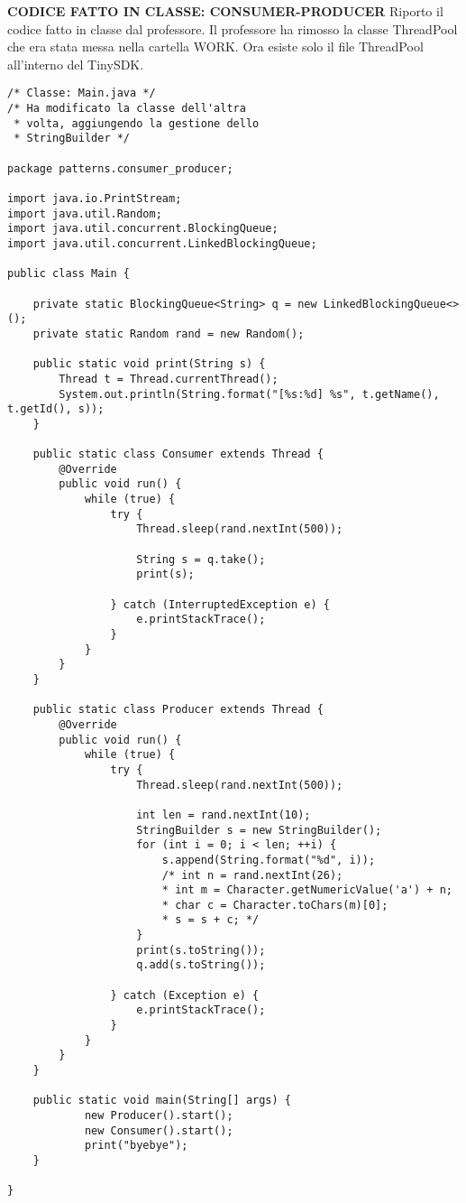 \noindent \textbf{CODICE FATTO IN CLASSE: CONSUMER-PRODUCER} \newline
Riporto il codice fatto in classe dal professore. \newline
Il professore ha rimosso la classe ThreadPool che era stata messa nella cartella WORK. Ora esiste solo il file ThreadPool all'interno del TinySDK. \newline


\begin{lstlisting}
/* Classe: Main.java */
/* Ha modificato la classe dell'altra
 * volta, aggiungendo la gestione dello
 * StringBuilder */

package patterns.consumer_producer;

import java.io.PrintStream;
import java.util.Random;
import java.util.concurrent.BlockingQueue;
import java.util.concurrent.LinkedBlockingQueue;

public class Main {

    private static BlockingQueue<String> q = new LinkedBlockingQueue<>();
    private static Random rand = new Random();

    public static void print(String s) {
        Thread t = Thread.currentThread();
        System.out.println(String.format("[%s:%d] %s", t.getName(), t.getId(), s));
    }

    public static class Consumer extends Thread {
        @Override
        public void run() {
            while (true) {
                try {
                    Thread.sleep(rand.nextInt(500));

                    String s = q.take();
                    print(s);

                } catch (InterruptedException e) {
                    e.printStackTrace();
                }
            }
        }
    }

    public static class Producer extends Thread {
        @Override
        public void run() {
            while (true) {
                try {
                    Thread.sleep(rand.nextInt(500));

                    int len = rand.nextInt(10);
                    StringBuilder s = new StringBuilder();
                    for (int i = 0; i < len; ++i) {
                        s.append(String.format("%d", i));
						/* int n = rand.nextInt(26);
                        * int m = Character.getNumericValue('a') + n;
                        * char c = Character.toChars(m)[0];
                        * s = s + c; */
                    }
                    print(s.toString());
                    q.add(s.toString());

                } catch (Exception e) {
                    e.printStackTrace();
                }
            }
        }
    }

    public static void main(String[] args) {
            new Producer().start();
            new Consumer().start();
            print("byebye");
    }

}

\end{lstlisting}

















